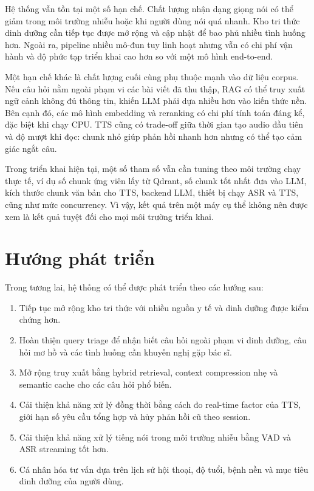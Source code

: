 \documentclass[a4paper,13pt,oneside]{report}
\begin{document}
Hệ thống vẫn tồn tại một số hạn chế. Chất lượng nhận dạng giọng nói có thể giảm trong môi trường nhiễu hoặc khi người dùng nói quá nhanh. Kho tri thức dinh dưỡng cần tiếp tục được mở rộng và cập nhật để bao phủ nhiều tình huống hơn. Ngoài ra, pipeline nhiều mô-đun tuy linh hoạt nhưng vẫn có chi phí vận hành và độ phức tạp triển khai cao hơn so với một mô hình end-to-end.

Một hạn chế khác là chất lượng cuối cùng phụ thuộc mạnh vào dữ liệu corpus. Nếu câu hỏi nằm ngoài phạm vi các bài viết đã thu thập, RAG có thể truy xuất ngữ cảnh không đủ thông tin, khiến LLM phải dựa nhiều hơn vào kiến thức nền. Bên cạnh đó, các mô hình embedding và reranking có chi phí tính toán đáng kể, đặc biệt khi chạy CPU. TTS cũng có trade-off giữa thời gian tạo audio đầu tiên và độ mượt khi đọc: chunk nhỏ giúp phản hồi nhanh hơn nhưng có thể tạo cảm giác ngắt câu.

Trong triển khai hiện tại, một số tham số vẫn cần tuning theo môi trường chạy thực tế, ví dụ số chunk ứng viên lấy từ Qdrant, số chunk tốt nhất đưa vào LLM, kích thước chunk văn bản cho TTS, backend LLM, thiết bị chạy ASR và TTS, cũng như mức concurrency. Vì vậy, kết quả trên một máy cụ thể không nên được xem là kết quả tuyệt đối cho mọi môi trường triển khai.

\section{Hướng phát triển}

Trong tương lai, hệ thống có thể được phát triển theo các hướng sau:
\begin{enumerate}[label=\arabic*)]
    \item Tiếp tục mở rộng kho tri thức với nhiều nguồn y tế và dinh dưỡng được kiểm chứng hơn.
    \item Hoàn thiện query triage để nhận biết câu hỏi ngoài phạm vi dinh dưỡng, câu hỏi mơ hồ và các tình huống cần khuyến nghị gặp bác sĩ.
    \item Mở rộng truy xuất bằng hybrid retrieval, context compression nhẹ và semantic cache cho các câu hỏi phổ biến.
    \item Cải thiện khả năng xử lý đồng thời bằng cách đo real-time factor của TTS, giới hạn số yêu cầu tổng hợp và hủy phản hồi cũ theo session.
    \item Cải thiện khả năng xử lý tiếng nói trong môi trường nhiễu bằng VAD và ASR streaming tốt hơn.
    \item Cá nhân hóa tư vấn dựa trên lịch sử hội thoại, độ tuổi, bệnh nền và mục tiêu dinh dưỡng của người dùng.
\end{enumerate}
\end{document}
